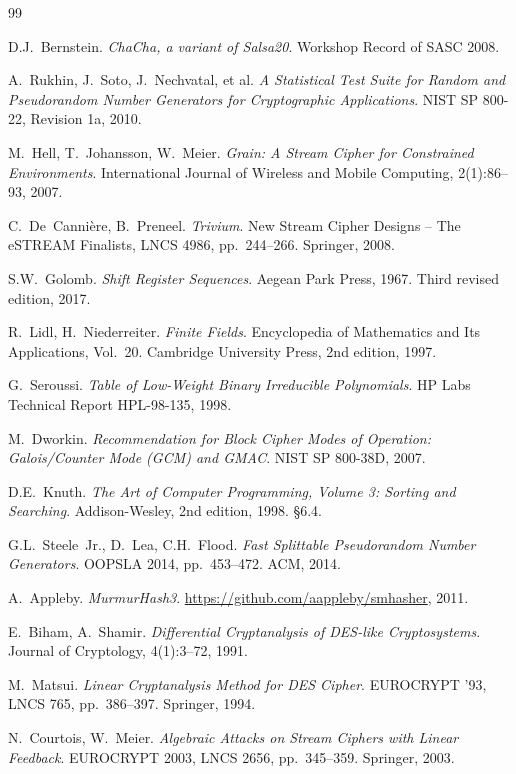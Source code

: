 \documentclass[11pt,a4paper]{ctexart}
\begin{document}
\begin{thebibliography}{99}

D.J.~Bernstein. \emph{ChaCha, a variant of Salsa20}. Workshop Record of SASC 2008.

A.~Rukhin, J.~Soto, J.~Nechvatal, et al. \emph{A Statistical Test Suite for Random and Pseudorandom Number Generators for Cryptographic Applications}. NIST SP 800-22, Revision 1a, 2010.

M.~Hell, T.~Johansson, W.~Meier. \emph{Grain: A Stream Cipher for Constrained Environments}. International Journal of Wireless and Mobile Computing, 2(1):86--93, 2007.

C.~De~Canni\`ere, B.~Preneel. \emph{Trivium}. New Stream Cipher Designs -- The eSTREAM Finalists, LNCS 4986, pp.~244--266. Springer, 2008.

S.W.~Golomb. \emph{Shift Register Sequences}. Aegean Park Press, 1967. Third revised edition, 2017.

R.~Lidl, H.~Niederreiter. \emph{Finite Fields}. Encyclopedia of Mathematics and Its Applications, Vol.~20. Cambridge University Press, 2nd edition, 1997.

G.~Seroussi. \emph{Table of Low-Weight Binary Irreducible Polynomials}. HP Labs Technical Report HPL-98-135, 1998.

M.~Dworkin. \emph{Recommendation for Block Cipher Modes of Operation: Galois/Counter Mode (GCM) and GMAC}. NIST SP 800-38D, 2007.

D.E.~Knuth. \emph{The Art of Computer Programming, Volume 3: Sorting and Searching}. Addison-Wesley, 2nd edition, 1998. \S6.4.

G.L.~Steele~Jr., D.~Lea, C.H.~Flood. \emph{Fast Splittable Pseudorandom Number Generators}. OOPSLA 2014, pp.~453--472. ACM, 2014.

A.~Appleby. \emph{MurmurHash3}. \url{https://github.com/aappleby/smhasher}, 2011.

E.~Biham, A.~Shamir. \emph{Differential Cryptanalysis of DES-like Cryptosystems}. Journal of Cryptology, 4(1):3--72, 1991.

M.~Matsui. \emph{Linear Cryptanalysis Method for DES Cipher}. EUROCRYPT '93, LNCS 765, pp.~386--397. Springer, 1994.

N.~Courtois, W.~Meier. \emph{Algebraic Attacks on Stream Ciphers with Linear Feedback}. EUROCRYPT 2003, LNCS 2656, pp.~345--359. Springer, 2003.


\end{thebibliography}
\end{document}
